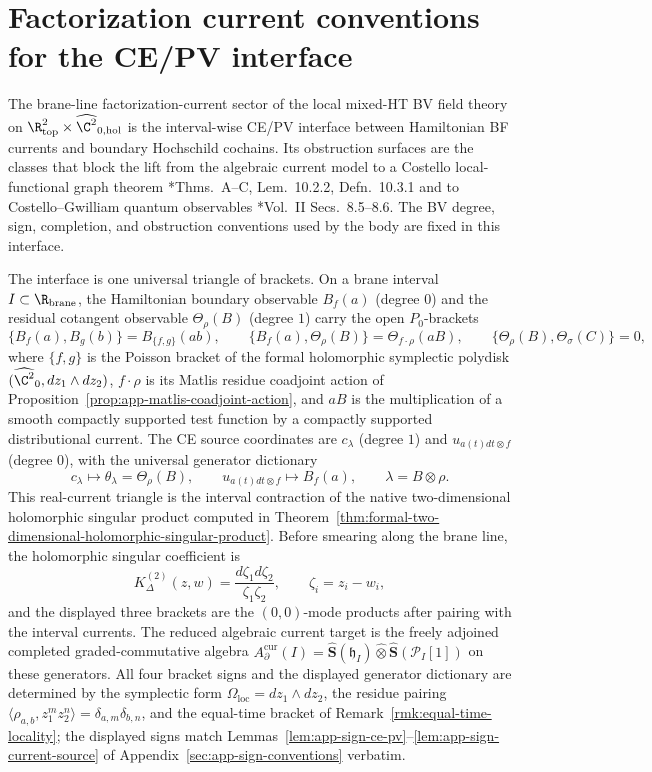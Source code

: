 \section{Factorization current conventions for the CE/PV interface}
\label{sec:app-factorization-current-conventions}

The brane-line factorization-current sector of the local mixed-HT
BV field theory on
\(\R^2_{\mathrm{top}}\times\widehat{\C^2}_{0,\mathrm{hol}}\) is the
interval-wise CE/PV interface between Hamiltonian BF currents and
boundary Hochschild cochains.  Its obstruction surfaces are the
classes that block the lift from the algebraic current model to a
Costello local-functional graph theorem
\cite{costello-renormalization}*{Thms.~A--C, Lem.~10.2.2, Defn.~10.3.1}
and to Costello--Gwilliam quantum observables
\cite{costello-gwilliam-vol2}*{Vol.~II Secs.~8.5--8.6}.
The BV degree, sign, completion, and obstruction conventions used by
the body are fixed in this interface.

The interface is one universal triangle of brackets.  On a brane interval
\(I\subset\R_{\mathrm{brane}}\), the Hamiltonian boundary observable
\(B_f(a)\) (degree \(0\)) and the residual cotangent observable
\(\Theta_\rho(B)\) (degree \(1\)) carry the open \(P_0\)-brackets
\[
  \{B_f(a),B_g(b)\}=B_{\{f,g\}}(ab),\qquad
  \{B_f(a),\Theta_\rho(B)\}=\Theta_{f\cdot\rho}(aB),\qquad
  \{\Theta_\rho(B),\Theta_\sigma(C)\}=0,
\]
where \(\{f,g\}\) is the Poisson bracket of the formal holomorphic
symplectic polydisk \((\widehat{\C^2}_0,dz_1\wedge dz_2)\),
\(f\cdot\rho\) is its Matlis residue coadjoint action of
Proposition~\ref{prop:app-matlis-coadjoint-action}, and \(aB\) is the
multiplication of a smooth compactly supported test function by a
compactly supported distributional current.  The CE source coordinates
are \(c_\lambda\) (degree \(1\)) and \(u_{a(t)dt\otimes f}\) (degree
\(0\)), with the universal generator dictionary
\[
  c_\lambda\longmapsto\theta_\lambda=\Theta_\rho(B),\qquad
  u_{a(t)dt\otimes f}\longmapsto B_f(a),\qquad
  \lambda=B\otimes\rho .
\]
This real-current triangle is the interval contraction of the native
two-dimensional holomorphic singular product computed in
Theorem~\ref{thm:formal-two-dimensional-holomorphic-singular-product}.  Before
smearing along the brane line, the
holomorphic singular coefficient is
\[
  K^{(2)}_\Delta(z,w)=
  \frac{d\zeta_1d\zeta_2}{\zeta_1\zeta_2},
  \qquad \zeta_i=z_i-w_i ,
\]
and the displayed three brackets are the \((0,0)\)-mode products
after pairing with the interval currents.
The reduced algebraic current target is the freely adjoined completed
graded-commutative algebra
\(A_\partial^{\mathrm{cur}}(I)
   =\widehat{\mathbf S}(\mathfrak h_I)
    \widehat\otimes
    \widehat{\mathbf S}(\mathcal P_I[1])\)
on these generators.  All four bracket signs and the displayed
generator dictionary are determined by the symplectic form
\(\Omega_{\mathrm{loc}}=dz_1\wedge dz_2\), the residue pairing
\(\langle\rho_{a,b},z_1^mz_2^n\rangle=\delta_{a,m}\delta_{b,n}\), and
the equal-time bracket of
Remark~\ref{rmk:equal-time-locality}; the displayed signs match
Lemmas~\ref{lem:app-sign-ce-pv}--\ref{lem:app-sign-current-source} of
Appendix~\ref{sec:app-sign-conventions} verbatim.


